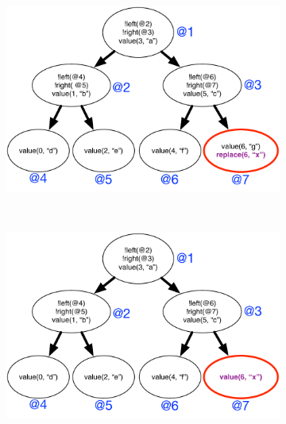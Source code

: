\begin{figure}[h]
\begin{subfigure}[b]{0.5\textwidth}
                \label{fig:language:btree_trace2}
        \end{subfigure}\\
        \begin{subfigure}[b]{0.5\textwidth}
                \includegraphics[width=\textwidth]{figures/btree/btree_trace3}
                \label{fig:language:btree_trace3}
        \end{subfigure}%
        ~
        \begin{subfigure}[b]{0.5\textwidth}
                  \includegraphics[width=\textwidth]{figures/btree/btree_trace4}
                  \label{fig:language:btree_trace4}
          \end{subfigure}
        \label{fig:language:btree_trace}
\end{figure}

